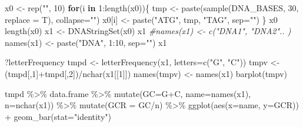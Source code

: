 \documentclass[
]{book}
\newenvironment{Shaded}{\begin{snugshade}}{\end{snugshade}}
\newcommand{\AttributeTok}[1]{\textcolor[rgb]{0.77,0.63,0.00}{#1}}
\newcommand{\CommentTok}[1]{\textcolor[rgb]{0.56,0.35,0.01}{\textit{#1}}}
\newcommand{\ControlFlowTok}[1]{\textcolor[rgb]{0.13,0.29,0.53}{\textbf{#1}}}
\newcommand{\DecValTok}[1]{\textcolor[rgb]{0.00,0.00,0.81}{#1}}
\newcommand{\FunctionTok}[1]{\textcolor[rgb]{0.00,0.00,0.00}{#1}}
\newcommand{\NormalTok}[1]{#1}
\newcommand{\OtherTok}[1]{\textcolor[rgb]{0.56,0.35,0.01}{#1}}
\newcommand{\SpecialCharTok}[1]{\textcolor[rgb]{0.00,0.00,0.00}{#1}}
\newcommand{\StringTok}[1]{\textcolor[rgb]{0.31,0.60,0.02}{#1}}
\begin{document}
\begin{Shaded}
\begin{Highlighting}[]
\NormalTok{x0 }\OtherTok{\textless{}{-}} \FunctionTok{rep}\NormalTok{(}\StringTok{""}\NormalTok{, }\DecValTok{10}\NormalTok{)}
\ControlFlowTok{for}\NormalTok{(i }\ControlFlowTok{in} \DecValTok{1}\SpecialCharTok{:}\FunctionTok{length}\NormalTok{(x0))\{}
\NormalTok{  tmp }\OtherTok{\textless{}{-}} \FunctionTok{paste}\NormalTok{(}\FunctionTok{sample}\NormalTok{(DNA\_BASES, }\DecValTok{30}\NormalTok{, }\AttributeTok{replace =}\NormalTok{ T), }\AttributeTok{collapse=}\StringTok{""}\NormalTok{)}
\NormalTok{  x0[i] }\OtherTok{\textless{}{-}} \FunctionTok{paste}\NormalTok{(}\StringTok{"ATG"}\NormalTok{, tmp, }\StringTok{"TAG"}\NormalTok{, }\AttributeTok{sep=}\StringTok{""}\NormalTok{)}
\NormalTok{\}}
\NormalTok{x0}
\FunctionTok{length}\NormalTok{(x0)}
\NormalTok{x1 }\OtherTok{\textless{}{-}} \FunctionTok{DNAStringSet}\NormalTok{(x0)}
\NormalTok{x1}
\CommentTok{\#names(x1) \textless{}{-} c("DNA1", "DNA2".. )}
\FunctionTok{names}\NormalTok{(x1) }\OtherTok{\textless{}{-}} \FunctionTok{paste}\NormalTok{(}\StringTok{"DNA"}\NormalTok{, }\DecValTok{1}\SpecialCharTok{:}\DecValTok{10}\NormalTok{, }\AttributeTok{sep=}\StringTok{""}\NormalTok{)}
\NormalTok{x1}


\NormalTok{?letterFrequency}
\NormalTok{tmpd }\OtherTok{\textless{}{-}} \FunctionTok{letterFrequency}\NormalTok{(x1, }\AttributeTok{letters=}\FunctionTok{c}\NormalTok{(}\StringTok{"G"}\NormalTok{, }\StringTok{"C"}\NormalTok{))}
\NormalTok{tmpv }\OtherTok{\textless{}{-}}\NormalTok{ (tmpd[,}\DecValTok{1}\NormalTok{]}\SpecialCharTok{+}\NormalTok{tmpd[,}\DecValTok{2}\NormalTok{])}\SpecialCharTok{/}\FunctionTok{nchar}\NormalTok{(x1[[}\DecValTok{1}\NormalTok{]])}
\FunctionTok{names}\NormalTok{(tmpv) }\OtherTok{\textless{}{-}} \FunctionTok{names}\NormalTok{(x1)}
\FunctionTok{barplot}\NormalTok{(tmpv)}



\NormalTok{tmpd }\SpecialCharTok{\%\textgreater{}\%} 
\NormalTok{  data.frame }\SpecialCharTok{\%\textgreater{}\%} 
  \FunctionTok{mutate}\NormalTok{(}\AttributeTok{GC=}\NormalTok{G}\SpecialCharTok{+}\NormalTok{C, }\AttributeTok{name=}\FunctionTok{names}\NormalTok{(x1), }\AttributeTok{n=}\FunctionTok{nchar}\NormalTok{(x1)) }\SpecialCharTok{\%\textgreater{}\%} 
  \FunctionTok{mutate}\NormalTok{(}\AttributeTok{GCR =}\NormalTok{ GC}\SpecialCharTok{/}\NormalTok{n) }\SpecialCharTok{\%\textgreater{}\%} 
  \FunctionTok{ggplot}\NormalTok{(}\FunctionTok{aes}\NormalTok{(}\AttributeTok{x=}\NormalTok{name, }\AttributeTok{y=}\NormalTok{GCR)) }\SpecialCharTok{+}
    \FunctionTok{geom\_bar}\NormalTok{(}\AttributeTok{stat=}\StringTok{"identity"}\NormalTok{)}
\end{Highlighting}
\end{Shaded}
\end{document}
